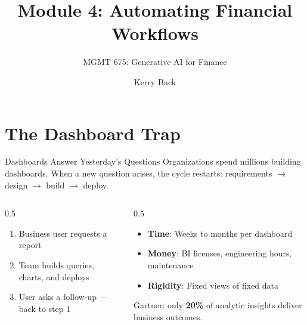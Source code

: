 \documentclass[aspectratio=169]{beamer}
\subtitle{MGMT 675: Generative AI for Finance}
\title{Module 4: Automating Financial Workflows}
\author{Kerry Back}
\date{}
\begin{document}
\maketitle

\section{The Dashboard Trap}

\begin{frame}{Dashboards Answer Yesterday's Questions}
Organizations spend millions building dashboards. When a new question arises, the cycle restarts: requirements $\rightarrow$ design $\rightarrow$ build $\rightarrow$ deploy.
\vspace{0.3cm}
\begin{columns}[T]
\begin{column}{0.5\textwidth}
\begin{shadedbox}[title=\textbf{The Typical Dashboard Lifecycle}]
\begin{enumerate}\small
  \item Business user requests a report
  \item Team builds queries, charts, and deploys
  \item User asks a follow-up --- \alert{back to step 1}
\end{enumerate}
\end{shadedbox}
\end{column}
\begin{column}{0.5\textwidth}
\begin{shadedbox}[title=\textbf{The Cost}]
\begin{itemize}\small
  \item \textbf{Time}: Weeks to months per dashboard
  \item \textbf{Money}: BI licenses, engineering hours, maintenance
  \item \textbf{Rigidity}: Fixed views of fixed data
\end{itemize}
\end{shadedbox}
\vspace{0.2cm}
Gartner: only \textbf{20\%} of analytic insights deliver business outcomes.
\end{column}
\end{columns}
\end{frame}
\end{document}
